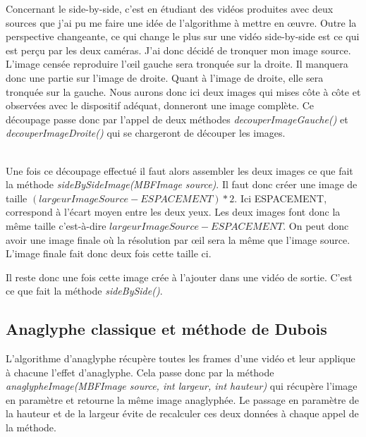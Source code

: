 \documentclass[10pt,a4paper]{article}
\begin{document}
Concernant le side-by-side, c'est en étudiant des vidéos produites avec deux sources que j'ai pu me faire une idée de l'algorithme à mettre en œuvre. Outre la perspective changeante,
ce qui change le plus sur une vidéo side-by-side est ce qui est perçu par les deux caméras. J'ai donc décidé de tronquer mon image source. L'image censée reproduire l'œil gauche sera tronquée sur la droite.
Il manquera donc une partie sur l'image de droite. Quant à l'image de droite, elle sera tronquée sur la gauche.  Nous aurons donc ici deux images qui mises côte à côte et observées avec le dispositif adéquat,
donneront une image complète.
Ce découpage passe donc par l'appel de deux méthodes \textit{decouperImageGauche()} et \textit{decouperImageDroite()} qui se chargeront de découper les images.


~~\\

Une fois ce découpage effectué il faut alors assembler les deux images ce que fait la méthode \textit{sideBySideImage(MBFImage source)}.
Il faut donc créer une image de taille $(largeurImageSource - ESPACEMENT) * 2$. Ici ESPACEMENT, correspond à l'écart moyen entre les deux yeux.
Les deux images font donc la même taille c'est-à-dire $largeurImageSource - ESPACEMENT$. On peut donc avoir une image finale où la résolution par œil sera la même que l'image source. L'image
finale fait donc deux fois cette taille ci.

Il reste donc une fois cette image crée à l'ajouter dans une vidéo de sortie. C'est ce que fait la méthode \textit{sideBySide()}.



\subsection{Anaglyphe classique et méthode de Dubois}

L'algorithme d'anaglyphe récupère toutes les frames d'une vidéo et leur applique à chacune l'effet d'anaglyphe. Cela passe donc par la méthode \textit{anaglypheImage(MBFImage source, int largeur, int hauteur)}
qui récupère l'image en paramètre et retourne la même image anaglyphée. Le passage en paramètre de la hauteur et de la largeur évite de recalculer ces deux données à chaque appel de la méthode.
\end{document}
